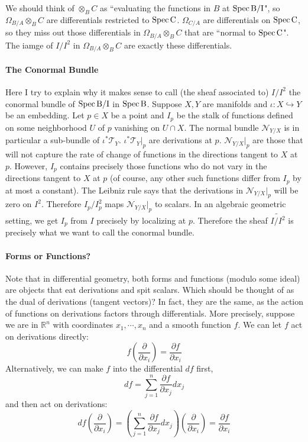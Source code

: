 \documentclass[12pt]{article}
\theoremstyle{plain}
\theoremstyle{definition}
\newcommand{\IR}{\mathbb{R}}
\newcommand{\shN}{\mathscr{N}}
\newcommand{\shT}{\mathscr{T}}
\newcommand{\Spec}{\rm Spec\,}
\newcommand\tensor{{\otimes}}
\newcommand{\<}{\langle}
\renewcommand{\>}{\rangle}
\newcommand{\into}{\hookrightarrow}
\def\wt{\widetilde}
\newcommand{\p}{\partial}
\newcommand{\Ohm}{\Omega}
\begin{document}
We should think of $\tensor_B C$ as ``evaluating the functions in $B$ at $\Spec B/I$", so $\Ohm_{B/A} \tensor_B C$ are differentials restricted to $\Spec C$. $\Ohm_{C/A}$ are differentials on $\Spec C$, so they miss out those differentials in $\Ohm_{B/A} \tensor_B C$ that are ``normal to $\Spec C$". The iamge of $I/I^2$ in $\Ohm_{B/A} \tensor_B C$ are exactly these differentials. 

\paragraph{The Conormal Bundle}
Here I try to explain why it makes sense to call (the sheaf associated to) $I/I^2$ the conormal bundle of $\Spec B/I$ in $\Spec B$. Suppose $X, Y$ are manifolds and $\iota : X \into Y$ be an embedding. Let $p \in X$ be a point and $I_p$ be the stalk of functions defined on some neighborhood $U$ of $p$ vanishing on $U \cap X$. The normal bundle $\shN_{Y/X}$ is in particular a sub-bundle of $\iota^* \shT_{Y}$. $\iota^* \shT_{Y}|_p$ are derivations at $p$. $\shN_{Y/X}|_p$ are those that will not capture the rate of change of functions in the directions tangent to $X$ at $p$. However, $I_p$ contains precisely those functions who do not vary in the directions tangent to $X$ at $p$ (of course, any other such functions differ from $I_p$ by at most a constant). The Leibniz rule says that the derivations in $\shN_{Y/X}|_p$ will be zero on $I^2$. Therefore $I_p/I_p^2$ maps $\shN_{Y/X}|_p$ to scalars. In an algebraic geometric setting, we get $I_p$ from $I$ precisely by localizing at $p$. Therefore the sheaf $\wt{I/I^2}$ is precisely what we want to call the conormal bundle.  

\paragraph{Forms or Functions?}
Note that in differential geometry, both forms and functions (modulo some ideal) are objects that eat derivations and spit scalars. Which should be thought of as the dual of derivations (tangent vectors)? In fact, they are the same, as the action of functions on derivations factors through differentials. More precisely, suppose we are in $\IR^n$ with coordinates $x_1, \cdots, x_n$ and a smooth function $f$. We can let $f$ act on derivations directly: 
$$ f(\frac{\p}{\p x_i}) = \frac{\p f}{\p x_i} $$
Alternatively, we can make $f$ into the differential $df$ first, 
$$ df = \sum_{j = 1}^n \frac{\p f}{\p x_j} dx_j $$
and then act on derivations: 
$$ df(\frac{\p}{\p x_i}) = (\sum_{j = 1}^n \frac{\p f}{\p x_j} dx_j)(\frac{\p}{\p x_i}) = \frac{\p f}{\p x_i} $$
\end{document}
